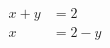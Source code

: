 \documentclass{article}
\begin{document}
\begin{align*}
  x + y &= 2\\
  x &= 2 - y
\end{align*}
\end{document}
